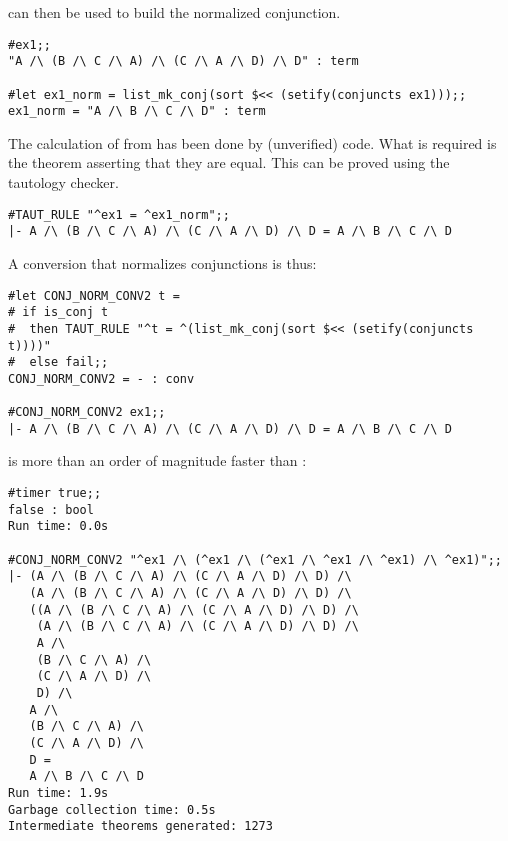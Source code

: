 \noindent can then be used to build the normalized conjunction.


\begin{session}\begin{verbatim}
#ex1;;
"A /\ (B /\ C /\ A) /\ (C /\ A /\ D) /\ D" : term

#let ex1_norm = list_mk_conj(sort $<< (setify(conjuncts ex1)));;
ex1_norm = "A /\ B /\ C /\ D" : term
\end{verbatim}\end{session}

\noindent The calculation of  from  has been
done by (unverified) \ML{} code. What is required is the theorem
asserting that they are equal. This can be proved using the tautology
checker.

\begin{session}\begin{verbatim}
#TAUT_RULE "^ex1 = ^ex1_norm";;
|- A /\ (B /\ C /\ A) /\ (C /\ A /\ D) /\ D = A /\ B /\ C /\ D
\end{verbatim}\end{session}

\noindent A conversion that normalizes conjunctions is thus:

\begin{session}\begin{verbatim}
#let CONJ_NORM_CONV2 t =
# if is_conj t
#  then TAUT_RULE "^t = ^(list_mk_conj(sort $<< (setify(conjuncts t))))"
#  else fail;;
CONJ_NORM_CONV2 = - : conv

#CONJ_NORM_CONV2 ex1;;
|- A /\ (B /\ C /\ A) /\ (C /\ A /\ D) /\ D = A /\ B /\ C /\ D
\end{verbatim}\end{session}

\noindent {} is more than an order of magnitude faster 
than :


\begin{session}\begin{verbatim}
#timer true;;
false : bool
Run time: 0.0s

#CONJ_NORM_CONV2 "^ex1 /\ (^ex1 /\ (^ex1 /\ ^ex1 /\ ^ex1) /\ ^ex1)";;
|- (A /\ (B /\ C /\ A) /\ (C /\ A /\ D) /\ D) /\
   (A /\ (B /\ C /\ A) /\ (C /\ A /\ D) /\ D) /\
   ((A /\ (B /\ C /\ A) /\ (C /\ A /\ D) /\ D) /\
    (A /\ (B /\ C /\ A) /\ (C /\ A /\ D) /\ D) /\
    A /\
    (B /\ C /\ A) /\
    (C /\ A /\ D) /\
    D) /\
   A /\
   (B /\ C /\ A) /\
   (C /\ A /\ D) /\
   D =
   A /\ B /\ C /\ D
Run time: 1.9s
Garbage collection time: 0.5s
Intermediate theorems generated: 1273
\end{verbatim}\end{session}

